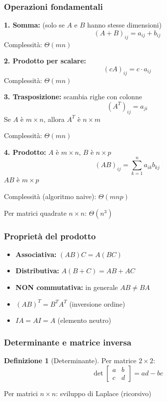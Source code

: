 \documentclass[a4paper, 11pt]{article}
\theoremstyle{definition}
\newtheorem{definizione}{Definizione}[section]
\theoremstyle{remark}
\theoremstyle{remark}
\begin{document}
	\subsubsection{Operazioni fondamentali}
	
	\textbf{1. Somma:} (solo se $A$ e $B$ hanno stesse dimensioni)
	\[
	(A + B)_{ij} = a_{ij} + b_{ij}
	\]
	Complessità: $\Theta(mn)$
	
	\textbf{2. Prodotto per scalare:}
	\[
	(cA)_{ij} = c \cdot a_{ij}
	\]
	Complessità: $\Theta(mn)$
	
	\textbf{3. Trasposizione:} scambia righe con colonne
	\[
	(A^T)_{ij} = a_{ji}
	\]
	Se $A$ è $m \times n$, allora $A^T$ è $n \times m$
	
	Complessità: $\Theta(mn)$
	
	\textbf{4. Prodotto:} $A$ è $m \times n$, $B$ è $n \times p$
	\[
	(AB)_{ij} = \sum_{k=1}^{n} a_{ik} b_{kj}
	\]
	$AB$ è $m \times p$
	
	Complessità (algoritmo naive): $\Theta(mnp)$
	
	Per matrici quadrate $n \times n$: $\Theta(n^3)$
	
	\subsubsection{Proprietà del prodotto}
	
	\begin{itemize}
		\item \textbf{Associativa:} $(AB)C = A(BC)$
		\item \textbf{Distributiva:} $A(B + C) = AB + AC$
		\item \textbf{NON commutativa:} in generale $AB \neq BA$
		\item $(AB)^T = B^T A^T$ (inversione ordine)
		\item $IA = AI = A$ (elemento neutro)
	\end{itemize}
	
	\subsubsection{Determinante e matrice inversa}
	
	\begin{definizione}[Determinante]
		Per matrice $2 \times 2$:
		\[
		\det \begin{bmatrix}
			a & b \\
			c & d
		\end{bmatrix} = ad - bc
		\]
		
		Per matrici $n \times n$: sviluppo di Laplace (ricorsivo)
	\end{definizione}
	
\end{document}
